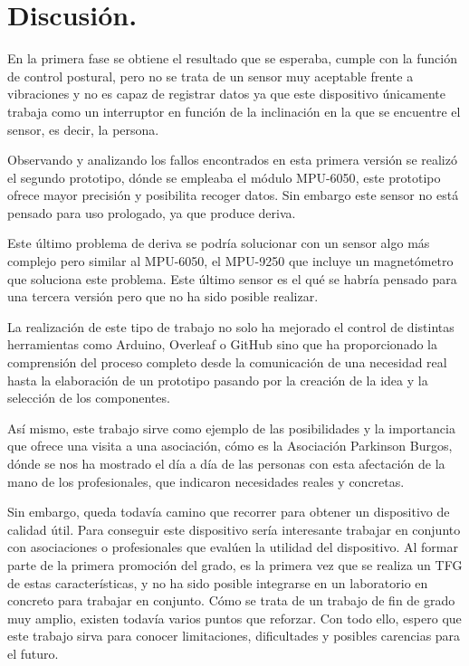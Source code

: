 \section{Discusión.}

En la primera fase se obtiene el resultado que se esperaba, cumple con la función de control postural, pero no se trata de un sensor muy aceptable frente a vibraciones y no es capaz de registrar datos ya que este dispositivo únicamente trabaja como un interruptor en función de la inclinación en la que se encuentre el sensor, es decir, la persona.

Observando y analizando los fallos encontrados en esta primera versión se realizó el segundo prototipo, dónde se empleaba el módulo MPU-6050\cite{MPU6050_1,MPU6050_2}, este prototipo ofrece mayor precisión y posibilita recoger datos. Sin embargo este sensor no está pensado para uso prologado, ya que produce deriva.

Este último problema de deriva se podría solucionar con un sensor algo más complejo pero similar al MPU-6050, el MPU-9250\cite{MPU9250_1,MPU9250_2} que incluye un magnetómetro que soluciona este problema. Este último sensor es el qué se habría pensado para una tercera versión pero que no ha sido posible realizar.

La realización de este tipo de trabajo no solo ha mejorado el control de distintas herramientas como Arduino, Overleaf o GitHub sino que ha proporcionado la comprensión del proceso completo desde la comunicación de una necesidad real hasta la elaboración de un prototipo pasando por la creación de la idea y la selección de los componentes.

Así mismo, este trabajo sirve como ejemplo de las posibilidades y la importancia que ofrece una visita a una asociación, cómo es la Asociación Parkinson Burgos\cite{ParkinsonBurgos}, dónde se nos ha mostrado el día a día de las personas con esta afectación de la mano de los profesionales, que indicaron necesidades reales y concretas. 

Sin embargo, queda todavía camino que recorrer para obtener un dispositivo de calidad útil. Para conseguir este dispositivo sería interesante trabajar en conjunto con asociaciones o profesionales que evalúen la utilidad del dispositivo. Al formar parte de la primera promoción del grado, es la primera vez que se realiza un TFG de estas características, y no ha sido posible integrarse en un laboratorio en concreto para trabajar en conjunto. Cómo se trata de un trabajo de fin de grado muy amplio, existen todavía varios puntos que reforzar. Con todo ello, espero que este trabajo sirva para conocer limitaciones, dificultades y posibles carencias para el futuro.


